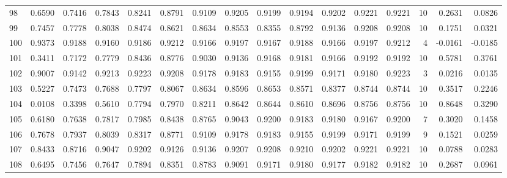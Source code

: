 \begin{tabular}{lrrrrrrrrrrrrrrr}
98  &      0.6590 &  0.7416 &  0.7843 &  0.8241 &  0.8791 &  0.9109 &  0.9205 &  0.9199 &  0.9194 &  0.9202 &   0.9221 &     0.9221 &     10 &                    0.2631 &                     0.0826 \\
99  &      0.7457 &  0.7778 &  0.8038 &  0.8474 &  0.8621 &  0.8634 &  0.8553 &  0.8355 &  0.8792 &  0.9136 &   0.9208 &     0.9208 &     10 &                    0.1751 &                     0.0321 \\
100 &      0.9373 &  0.9188 &  0.9160 &  0.9186 &  0.9212 &  0.9166 &  0.9197 &  0.9167 &  0.9188 &  0.9166 &   0.9197 &     0.9212 &      4 &                   -0.0161 &                    -0.0185 \\
101 &      0.3411 &  0.7172 &  0.7779 &  0.8436 &  0.8776 &  0.9030 &  0.9136 &  0.9168 &  0.9181 &  0.9166 &   0.9192 &     0.9192 &     10 &                    0.5781 &                     0.3761 \\
102 &      0.9007 &  0.9142 &  0.9213 &  0.9223 &  0.9208 &  0.9178 &  0.9183 &  0.9155 &  0.9199 &  0.9171 &   0.9180 &     0.9223 &      3 &                    0.0216 &                     0.0135 \\
103 &      0.5227 &  0.7473 &  0.7688 &  0.7797 &  0.8067 &  0.8634 &  0.8596 &  0.8653 &  0.8571 &  0.8377 &   0.8744 &     0.8744 &     10 &                    0.3517 &                     0.2246 \\
104 &      0.0108 &  0.3398 &  0.5610 &  0.7794 &  0.7970 &  0.8211 &  0.8642 &  0.8644 &  0.8610 &  0.8696 &   0.8756 &     0.8756 &     10 &                    0.8648 &                     0.3290 \\
105 &      0.6180 &  0.7638 &  0.7817 &  0.7985 &  0.8438 &  0.8765 &  0.9043 &  0.9200 &  0.9183 &  0.9180 &   0.9167 &     0.9200 &      7 &                    0.3020 &                     0.1458 \\
106 &      0.7678 &  0.7937 &  0.8039 &  0.8317 &  0.8771 &  0.9109 &  0.9178 &  0.9183 &  0.9155 &  0.9199 &   0.9171 &     0.9199 &      9 &                    0.1521 &                     0.0259 \\
107 &      0.8433 &  0.8716 &  0.9047 &  0.9202 &  0.9126 &  0.9136 &  0.9207 &  0.9208 &  0.9210 &  0.9202 &   0.9221 &     0.9221 &     10 &                    0.0788 &                     0.0283 \\
108 &      0.6495 &  0.7456 &  0.7647 &  0.7894 &  0.8351 &  0.8783 &  0.9091 &  0.9171 &  0.9180 &  0.9177 &   0.9182 &     0.9182 &     10 &                    0.2687 &                     0.0961 \\

\end{tabular}
